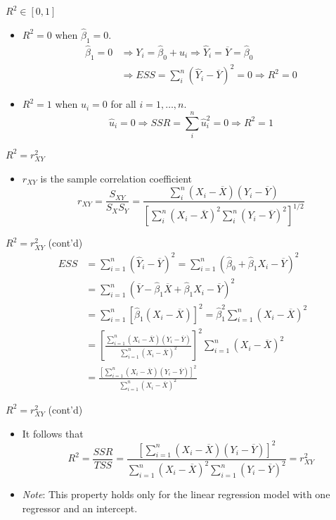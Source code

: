 \documentclass[presentation]{beamer}
\begin{document}
\begin{frame}[label={sec:orgdb12c94}]{\(R^2 \in [0, 1]\)}
\begin{itemize}
\item \(R^2 = 0\) when \(\hat{\beta}_1 = 0\).
\begin{align*}
\hat{\beta}_1 = 0 &\Rightarrow Y_i = \hat{\beta}_0 + \hat{u}_i
\Rightarrow \hat{Y}_i = \overline{Y} = \hat{\beta}_0 \\ 
&\Rightarrow ESS
= \sum_i^n (\hat{Y}_i - \overline{Y})^2 = 0 \Rightarrow R^2 = 0
\end{align*}
\item \(R^2 = 1\) when \(\hat{u}_i = 0\) for all \(i = 1, \ldots, n\).
\[ \hat{u}_i = 0 \Rightarrow SSR = \sum_i^n \hat{u}_i^2 = 0
  \Rightarrow R^2 = 1 \]
\end{itemize}
\end{frame}

\begin{frame}[label={sec:orgce96dc9}]{\(R^2 = r^2_{XY}\)}
\begin{itemize}
\item \(r_{XY}\) is the sample correlation coefficient
\[ r_{XY} = \frac{S_{XY}}{S_X S_Y} = \frac{\sum_i^n(X_i -
  \overline{X})(Y_i - \overline{Y})}{\left[\sum_i^n (X_i - \overline{X})^2 \sum_i^n (Y_i -
  \overline{Y})^2 \right]^{1/2}} \]
\end{itemize}
\end{frame}

\begin{frame}[label={sec:org03a1aa8}]{\(R^2 = r^2_{XY}\) (cont'd)}
\begin{align*}
ESS &= \sum_{i=1}^n (\hat{Y}_i - \overline{Y})^2 = \sum_{i=1}^n (\hat{\beta}_0 + \hat{\beta}_1 X_i - \overline{Y})^2 \\
&= \sum_{i=1}^n (\overline{Y} - \hat{\beta}_1 \overline{X} + \hat{\beta}_1 X_i - \overline{Y})^2 \\
&= \sum_{i=1}^n \left[ \hat{\beta}_1 (X_i - \overline{X}) \right]^2 = \hat{\beta}_1^2 \sum_{i=1}^n (X_i - \overline{X})^2 \\
&= \left[\frac{\sum_{i=1}^n (X_i - \overline{X})(Y_i - \overline{Y})}{\sum_{i=1}^n (X_i - \overline{X})^2}\right]^2 \sum_{i=1}^n (X_i - \overline{X})^2 \\
&= \frac{\left[ \sum_{i=1}^n (X_i - \overline{X})(Y_i - \overline{Y}) \right]^2}{\sum_{i=1}^n (X_i - \overline{X})^2}
\end{align*}
\end{frame}

\begin{frame}[label={sec:orgf10fd61}]{\(R^2 = r^2_{XY}\) (cont'd)}
\begin{itemize}
\item It follows that
\[
  R^2 = \frac{SSR}{TSS} = \frac{\left[ \sum_{i=1}^n (X_i - \overline{X})(Y_i - \overline{Y}) \right]^2}{\sum_{i=1}^n (X_i - \overline{X})^2 \sum_{i=1}^n (Y_i - \overline{Y})^2} = r^2_{XY}
  \]

\item \emph{Note}: This property holds only for the linear regression model
with \alert{one regressor and an intercept}.
\end{itemize}
\end{frame}
\end{document}

